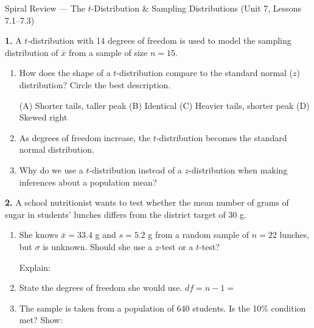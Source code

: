 \documentclass[10pt]{article}
\begin{document}
\namedateperiod

\vspace{0.15in}

\begin{notesbox}{Spiral Review --- The $t$-Distribution \& Sampling Distributions (Unit 7, Lessons 7.1--7.3)}

\textbf{1.} A $t$-distribution with 14 degrees of freedom is used to model the sampling
distribution of $\bar x$ from a sample of size $n = 15$.

\begin{enumerate}[label=\alph*.]
  \item How does the shape of a $t$-distribution compare to the standard normal ($z$) distribution?
        Circle the best description.

        \quad (A) Shorter tails, taller peak \quad (B) Identical \quad (C) Heavier tails, shorter peak \quad (D) Skewed right

  \item As degrees of freedom increase, the $t$-distribution becomes \blank{5cm} the standard
        normal distribution.

  \item Why do we use a $t$-distribution instead of a $z$-distribution when making inferences
        about a population mean? \writeline
\end{enumerate}

\vspace{0.12in}
\textbf{2.} A school nutritionist wants to test whether the mean number of grams of sugar in
students' lunches differs from the district target of 30 g.

\begin{enumerate}[label=\alph*.]
  \item She knows $\bar x = 33.4$ g and $s = 5.2$ g from a random sample of $n = 22$ lunches,
        but $\sigma$ is unknown. Should she use a $z$-test or a $t$-test? \blank{2.5cm}

        Explain: \writeline

  \item State the degrees of freedom she would use. \quad $df = n - 1 = $ \blank{2cm}

  \item The sample is taken from a population of 640 students.
        Is the 10\% condition met? \blank{1.5cm} Show: \blank{4cm}
\end{enumerate}

\end{notesbox}
\end{document}

